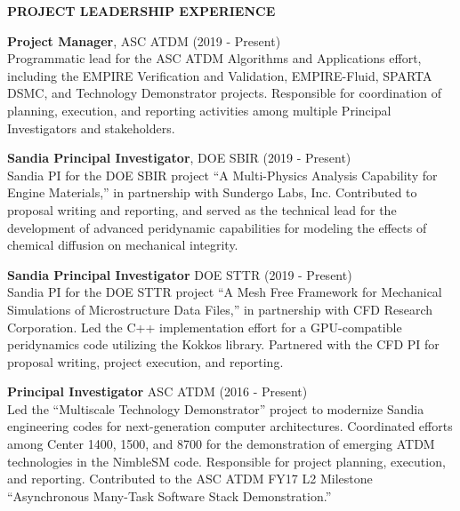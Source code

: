 
\vspace{\sectionskip}
\noindent
{\large \textbf{PROJECT LEADERSHIP EXPERIENCE}}
\vspace{\sectionskip}

\begin{minipage}{\minipagewidth}
\textbf{Project Manager}, ASC ATDM (2019 - Present) \\
%
Programmatic lead for the ASC ATDM Algorithms and Applications effort, including the EMPIRE Verification and Validation, EMPIRE-Fluid, SPARTA DSMC, and Technology Demonstrator projects.  Responsible for coordination of planning, execution, and reporting activities among multiple Principal Investigators and stakeholders.
\end{minipage}\vspace{\parskip}

\begin{minipage}{\minipagewidth}
\textbf{Sandia Principal Investigator}, DOE SBIR (2019 - Present) \\
%
Sandia PI for the DOE SBIR project ``A Multi-Physics Analysis Capability for Engine Materials,'' in partnership with Sundergo Labs, Inc.  Contributed to proposal writing and reporting, and served as the technical lead for the development of advanced peridynamic capabilities for modeling the effects of chemical diffusion on mechanical integrity.
\end{minipage}\vspace{\parskip}

\begin{minipage}{\minipagewidth}
\textbf{Sandia Principal Investigator} DOE STTR (2019 - Present) \\
%
Sandia PI for the DOE STTR project ``A Mesh Free Framework for Mechanical Simulations of Microstructure Data Files,'' in partnership with CFD Research Corporation.  Led the C++ implementation effort for a GPU-compatible peridynamics code utilizing the Kokkos library.  Partnered with the CFD PI for proposal writing, project execution, and reporting.
\end{minipage}\vspace{\parskip}

\begin{minipage}{\minipagewidth}
\textbf{Principal Investigator} ASC ATDM (2016 - Present) \\
%
Led the ``Multiscale Technology Demonstrator'' project to modernize Sandia engineering codes for next-generation computer architectures.  Coordinated efforts among Center 1400, 1500, and 8700 for the demonstration of emerging ATDM technologies in the NimbleSM code.  Responsible for project planning, execution, and reporting.  Contributed to the ASC ATDM FY17 L2 Milestone ``Asynchronous Many-Task Software Stack Demonstration.''
\end{minipage}\vspace{\parskip}


